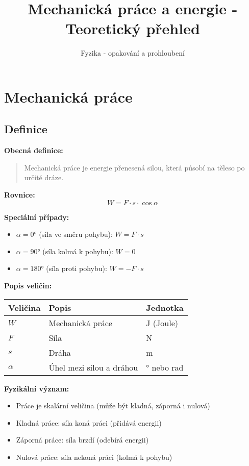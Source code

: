 \documentclass[11pt,a4paper]{article}
\title{Mechanická práce a energie - Teoretický přehled}
\author{Fyzika - opakování a prohloubení}
\date{}
\begin{document}
\maketitle

\section{Mechanická práce}

\subsection{Definice}

\textbf{Obecná definice:}
\begin{quote}
Mechanická práce je energie přenesená silou, která působí na těleso po určité dráze.
\end{quote}

\textbf{Rovnice:}
\[W = F \cdot s \cdot \cos\alpha\]

\textbf{Speciální případy:}
\begin{itemize}
\item $\alpha = 0°$ (síla ve směru pohybu): $W = F \cdot s$
\item $\alpha = 90°$ (síla kolmá k pohybu): $W = 0$
\item $\alpha = 180°$ (síla proti pohybu): $W = -F \cdot s$
\end{itemize}

\textbf{Popis veličin:}

\begin{longtable}{lll}
\toprule
Veličina & Popis & Jednotka \\
\midrule
$W$ & Mechanická práce & J (Joule) \\
$F$ & Síla & N \\
$s$ & Dráha & m \\
$\alpha$ & Úhel mezi silou a dráhou & ° nebo rad \\
\bottomrule
\end{longtable}

\textbf{Fyzikální význam:}
\begin{itemize}
\item Práce je skalární veličina (může být kladná, záporná i nulová)
\item Kladná práce: síla koná práci (přidává energii)
\item Záporná práce: síla brzdí (odebírá energii)
\item Nulová práce: síla nekoná práci (kolmá k pohybu)
\end{itemize}
\end{document}
